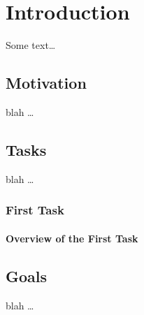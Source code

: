 \chapter{Introduction}
Some text\ldots

\section{Motivation}
blah \dots


\section{Tasks}
blah \dots

\subsection{First Task}

\subsubsection{Overview of the First Task }


\section{Goals}
blah \dots

